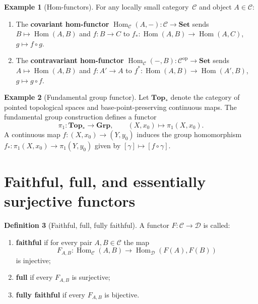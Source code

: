 \documentclass[a4paper,12pt]{book}
\DeclareMathOperator{\Hom}{Hom}
\newcommand{\Set}{\mathbf{Set}}
\newcommand{\Grp}{\mathbf{Grp}}
\newcommand{\Top}{\mathbf{Top}}
\newcommand{\op}{\mathrm{op}}
\theoremstyle{definition}
\newtheorem{definition}{Definition}[section]
\newtheorem{example}[definition]{Example}
\theoremstyle{plain}
\theoremstyle{remark}
\begin{document}
\begin{example}[Hom-functors]\label{ex:hom-functors}
For any locally small category~$\mathcal{C}$ and object $A\in\mathcal{C}$:
\begin{enumerate}[label=(\roman*)]
    \item The \textbf{covariant hom-functor}
          $\Hom_\mathcal{C}(A,-)\colon\mathcal{C}\to\Set$
          sends $B\mapsto\Hom(A,B)$ and $f\colon B\to C$ to
          $f_*\colon\Hom(A,B)\to\Hom(A,C)$, $g\mapsto f\circ g$.
    \item The \textbf{contravariant hom-functor}
          $\Hom_\mathcal{C}(-,B)\colon\mathcal{C}^{\op}\to\Set$
          sends $A\mapsto\Hom(A,B)$ and $f\colon A'\to A$ to
          $f^*\colon\Hom(A,B)\to\Hom(A',B)$, $g\mapsto g\circ f$.
\end{enumerate}
\end{example}

\begin{example}[Fundamental group functor]\label{ex:pi1-functor}
Let $\Top_*$ denote the category of pointed topological spaces and
base-point-preserving continuous maps.  The fundamental group construction
defines a functor
\[
    \pi_1\colon\Top_*\longrightarrow\Grp,
    \qquad (X,x_0)\longmapsto\pi_1(X,x_0).
\]
A continuous map $f\colon(X,x_0)\to(Y,y_0)$ induces the group
homomorphism $f_*\colon\pi_1(X,x_0)\to\pi_1(Y,y_0)$ given by
$[\gamma]\mapsto[f\circ\gamma]$.
\end{example}


\section{Faithful, full, and essentially surjective functors}
\label{sec:faithful-full}

\begin{definition}[Faithful, full, fully faithful]\label{def:faithful-full}
A functor $F\colon\mathcal{C}\to\mathcal{D}$ is called:
\begin{enumerate}[label=(\roman*)]
    \item \textbf{faithful} if for every pair $A,B\in\mathcal{C}$
          the map
          \[
              F_{A,B}\colon\Hom_\mathcal{C}(A,B)
              \longrightarrow\Hom_\mathcal{D}(F(A),F(B))
          \]
          is injective;
    \item \textbf{full} if every $F_{A,B}$ is surjective;
    \item \textbf{fully faithful} if every $F_{A,B}$ is bijective.
\end{enumerate}
\end{definition}
\end{document}
